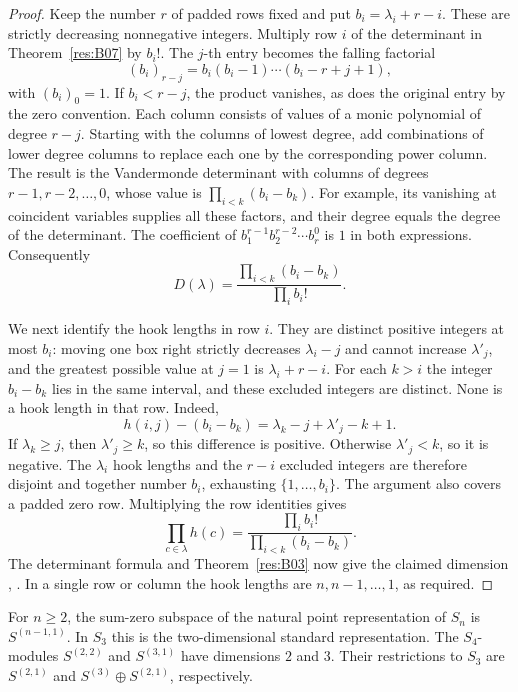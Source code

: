 \begin{proof}
Keep the number \(r\) of padded rows fixed and put
\(b_i=\lambda_i+r-i\). These are strictly decreasing nonnegative
integers. Multiply row \(i\) of the determinant in
Theorem~\ref{res:B07} by \(b_i!\). The \(j\)-th entry becomes
the falling factorial
\[
    (b_i)_{r-j}=b_i(b_i-1)\cdots(b_i-r+j+1),
\]
with \((b_i)_0=1\). If \(b_i<r-j\), the product vanishes, as does
the original entry by the zero convention. Each column consists of
values of a monic polynomial of degree \(r-j\). Starting with the
columns of lowest degree, add combinations of lower degree columns
to replace each one by the corresponding power column. The result
is the Vandermonde determinant with columns of degrees
\(r-1,r-2,\ldots,0\), whose value is
\(\prod_{i<k}(b_i-b_k)\). For example, its vanishing at coincident
variables supplies all these factors, and their degree equals
the degree of the determinant. The coefficient of
\(b_1^{r-1}b_2^{r-2}\cdots b_r^0\) is \(1\) in both expressions.
Consequently
\[
  D(\lambda)=\frac{\prod_{i<k}(b_i-b_k)}{\prod_i b_i!}.
\]

We next identify the hook lengths in row \(i\). They are distinct
positive integers at most \(b_i\): moving one box right strictly
decreases \(\lambda_i-j\) and cannot increase \(\lambda'_j\), and
the greatest possible value at \(j=1\) is \(\lambda_i+r-i\).
For each \(k>i\) the integer \(b_i-b_k\) lies in the same interval,
and these excluded integers are distinct. None is a hook length
in that row. Indeed,
\[
   h(i,j)-(b_i-b_k)=\lambda_k-j+\lambda'_j-k+1.
\]
If \(\lambda_k\ge j\), then \(\lambda'_j\ge k\), so this difference
is positive. Otherwise \(\lambda'_j<k\), so it is negative. The
\(\lambda_i\) hook lengths and the \(r-i\) excluded integers are
therefore disjoint and together number \(b_i\), exhausting
\(\{1,\ldots,b_i\}\). The argument also covers a padded zero row.
Multiplying the row identities gives
\[
   \prod_{c\in\lambda}h(c)
      = \frac{\prod_i b_i!}{\prod_{i<k}(b_i-b_k)}.
\]
The determinant formula and Theorem~\ref{res:B03} now give the
claimed dimension \cite[Theorem 3.10.2]{sagan},
\cite[Theorem 4.53]{etingof}. In a single row or column the hook
lengths are \(n,n-1,\ldots,1\), as required.
\end{proof}

\begin{example}\label{res:B09}
For \(n\ge 2\), the sum-zero subspace of the natural point
representation of \(S_n\) is \(S^{(n-1,1)}\). In \(S_3\) this is the
two-dimensional standard representation. The \(S_4\)-modules
\(S^{(2,2)}\) and \(S^{(3,1)}\) have dimensions \(2\) and \(3\).
Their restrictions to \(S_3\) are \(S^{(2,1)}\) and
\(S^{(3)}\oplus S^{(2,1)}\), respectively.
\end{example}

